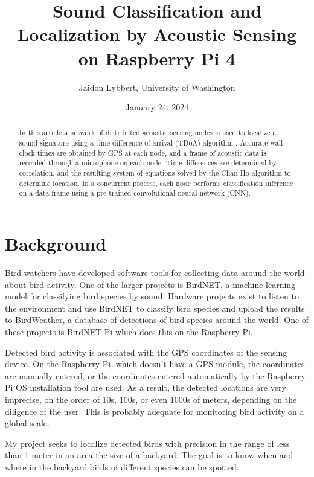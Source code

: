 \documentclass[12pt]{article}
\begin{document}
\title{Sound Classification and Localization by Acoustic Sensing on Raspberry Pi 4}
\author{Jaidon Lybbert, University of Washington}
\date{January 24, 2024}

\maketitle

\begin{abstract}
	In this article a network of distributed acoustic sensing nodes is used to localize a sound signature using a time-difference-of-arrival (TDoA) algorithm \cite{CobosMaximo2020FGCA}. Accurate wall-clock times are obtained by GPS at each node, and a frame of acoustic data is recorded through a microphone on each node. Time differences are determined by correlation, and the resulting system of equations solved by the Chan-Ho \cite{ChanY.T.1994Asae} algorithm to determine location. In a concurrent process, each node performs classification inference on a data frame using a pre-trained convolutional neural network (CNN).
\end{abstract}


\section{Background}\label{sec:background}

Bird watchers have developed software tools for collecting data around the world about bird activity. One of the larger projects is BirdNET, a machine learning model for classifying bird species by sound. Hardware projects exist to listen to the environment and use BirdNET to classify bird species and upload the results to BirdWeather, a database of detections of bird species around the world. One of these projects is BirdNET-Pi which does this on the Raspberry Pi. 

Detected bird activity is associated with the GPS coordinates of the sensing device. On the Raspberry Pi, which doesn't have a GPS module, the coordinates are manually entered, or the coordinates entered automatically by the Raspberry Pi OS installation tool are used. As a result, the detected locations are very imprecise, on the order of 10s, 100s, or even 1000s of meters, depending on the diligence of the user. This is probably adequate for monitoring bird activity on a global scale.

My project seeks to localize detected birds with precision in the range of less than 1 meter in an area the size of a backyard. The goal is to know when and where in the backyard birds of different species can be spotted. 
\end{document}
